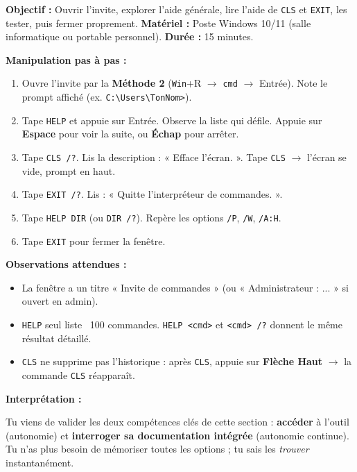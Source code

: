 \documentclass[11pt]{article}
\begin{document}
\begin{experience}
\textbf{Objectif :} Ouvrir l'invite, explorer l'aide générale, lire l'aide de \texttt{CLS} et \texttt{EXIT}, les tester, puis fermer proprement.
\textbf{Matériel :} Poste Windows 10/11 (salle informatique ou portable personnel).
\textbf{Durée :} 15 minutes.

\textbf{Manipulation pas à pas :}\par
\begin{enumerate}
    \item Ouvre l'invite par la \textbf{Méthode 2} (\texttt{Win}+R $\rightarrow$ \texttt{cmd} $\rightarrow$ Entrée). Note le prompt affiché (ex. \texttt{C:\textbackslash Users\textbackslash TonNom>}).
    \item Tape \texttt{HELP} et appuie sur Entrée. Observe la liste qui défile. Appuie sur \textbf{Espace} pour voir la suite, ou \textbf{Échap} pour arrêter.
    \item Tape \texttt{CLS /?}. Lis la description : « Efface l'écran. ». Tape \texttt{CLS} $\rightarrow$ l'écran se vide, prompt en haut.
    \item Tape \texttt{EXIT /?}. Lis : « Quitte l'interpréteur de commandes. ».
    \item Tape \texttt{HELP DIR} (ou \texttt{DIR /?}). Repère les options \texttt{/P}, \texttt{/W}, \texttt{/A:H}.
    \item Tape \texttt{EXIT} pour fermer la fenêtre.
\end{enumerate}

\textbf{Observations attendues :}\par
\begin{itemize}
    \item La fenêtre a un titre « Invite de commandes » (ou « Administrateur : ... » si ouvert en admin).
    \item \texttt{HELP} seul liste ~100 commandes. \texttt{HELP <cmd>} et \texttt{<cmd> /?} donnent le même résultat détaillé.
    \item \texttt{CLS} ne supprime pas l'historique : après \texttt{CLS}, appuie sur \textbf{Flèche Haut} $\rightarrow$ la commande \texttt{CLS} réapparaît.
\end{itemize}

\textbf{Interprétation :}\par
Tu viens de valider les deux compétences clés de cette section : \textbf{accéder} à l'outil (autonomie) et \textbf{interroger sa documentation intégrée} (autonomie continue). Tu n'as plus besoin de mémoriser toutes les options ; tu sais les \emph{trouver} instantanément.
\end{experience}
\end{document}
